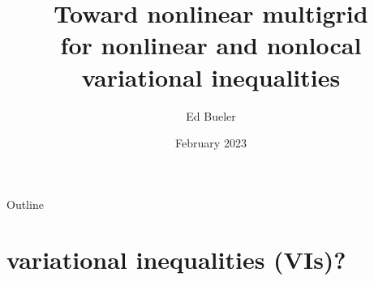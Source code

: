 \documentclass[svgnames,
               hyperref={colorlinks,citecolor=DeepPink4,linkcolor=FireBrick,urlcolor=Maroon},
               usepdftitle=false]  %
               {beamer}
\title[Multigrid for nonlinear VI]{Toward nonlinear multigrid \\ for nonlinear and nonlocal variational inequalities}
\author{Ed Bueler}
\institute[UAF]{University of Alaska Fairbanks}
\date[]{February 2023}
\begin{document}
\beamertemplatenavigationsymbolsempty


{
  \begin{frame}
    \titlepage
  \end{frame}
}

\begin{frame}{Outline}
  \tableofcontents[hideallsubsections]
\end{frame}


\section{variational inequalities (VIs)?}
\end{document}
